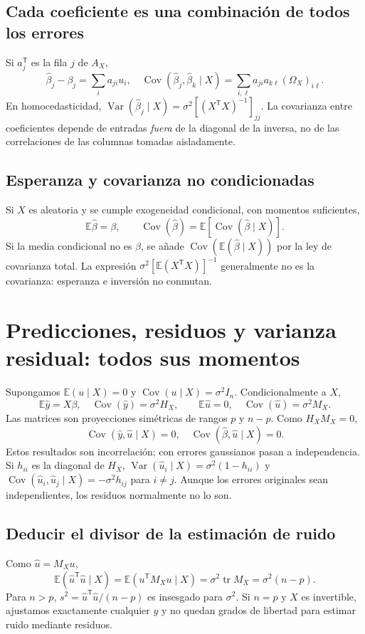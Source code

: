 \documentclass[11pt,a4paper]{article}
\newcommand{\E}{\mathbb E}
\newcommand{\T}{^{\mathsf T}}
\DeclareMathOperator{\Var}{Var}
\DeclareMathOperator{\Cov}{Cov}
\DeclareMathOperator{\tr}{tr}
\theoremstyle{definition}
\begin{document}
\subsection{Cada coeficiente es una combinación de todos los errores}
Si $a_j\T$ es la fila $j$ de $A_X$,
\[
\widehat\beta_j-\beta_j=\sum_i a_{ji}u_i,
\quad\Cov(\widehat\beta_j,\widehat\beta_k\mid X)
=\sum_{i,\ell}a_{ji}a_{k\ell}(\Omega_X)_{i\ell}.
\]
En homocedasticidad, $\Var(\widehat\beta_j\mid X)=\sigma^2[(X\T X)^{-1}]_{jj}$. La covarianza entre coeficientes depende de entradas \emph{fuera} de la diagonal de la inversa, no de las correlaciones de las columnas tomadas aisladamente.
\subsection{Esperanza y covarianza no condicionadas}
Si $X$ es aleatoria y se cumple exogeneidad condicional, con momentos suficientes,
\[
\E\widehat\beta=\beta,\qquad
\Cov(\widehat\beta)=\E[\Cov(\widehat\beta\mid X)].
\]
Si la media condicional no es $\beta$, se añade $\Cov(\E(\widehat\beta\mid X))$ por la ley de covarianza total. La expresión $\sigma^2[\E(X\T X)]^{-1}$ generalmente no es la covarianza: esperanza e inversión no conmutan.

\section{Predicciones, residuos y varianza residual: todos sus momentos}
Supongamos $\E(u\mid X)=0$ y $\Cov(u\mid X)=\sigma^2I_n$. Condicionalmente a $X$,
\[
\E\widehat y=X\beta,\quad\Cov(\widehat y)=\sigma^2H_X,
\qquad\E\widehat u=0,\quad\Cov(\widehat u)=\sigma^2M_X.
\]
Las matrices son proyecciones simétricas de rangos $p$ y $n-p$. Como $H_XM_X=0$,
\[
\Cov(\widehat y,\widehat u\mid X)=0,\quad
\Cov(\widehat\beta,\widehat u\mid X)=0.
\]
Estos resultados son incorrelación; con errores gaussianos pasan a independencia. Si $h_{ii}$ es la diagonal de $H_X$, $\Var(\widehat u_i\mid X)=\sigma^2(1-h_{ii})$ y $\Cov(\widehat u_i,\widehat u_j\mid X)=-\sigma^2h_{ij}$ para $i\ne j$. Aunque los errores originales sean independientes, los residuos normalmente no lo son.
\subsection{Deducir el divisor de la estimación de ruido}
Como $\widehat u=M_Xu$,
\[
\E(\widehat u\T\widehat u\mid X)=\E(u\T M_Xu\mid X)
=\sigma^2\tr M_X=\sigma^2(n-p).
\]
Para $n>p$, $s^2=\widehat u\T\widehat u/(n-p)$ es insesgado para $\sigma^2$. Si $n=p$ y $X$ es invertible, ajustamos exactamente cualquier $y$ y no quedan grados de libertad para estimar ruido mediante residuos.
\end{document}
